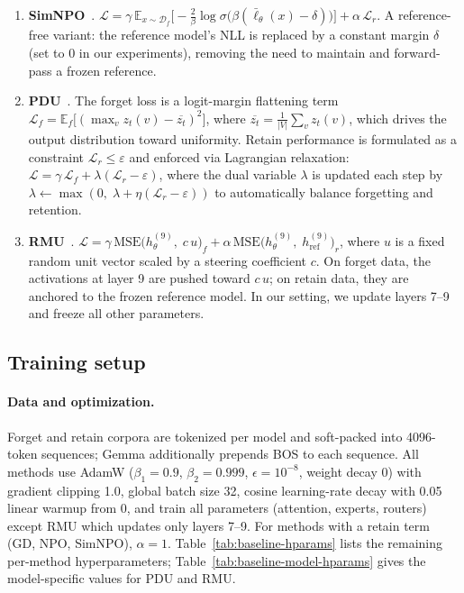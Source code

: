 \begin{enumerate}
\item \textbf{SimNPO}~\citep{fan2024simnpo}. $\mathcal{L} = \gamma\,\mathbb{E}_{x\sim\mathcal{D}_f}\!\Big[-\tfrac{2}{\beta}\log\sigma\!\big(\beta(\bar\ell_\theta(x)-\delta)\big)\Big]+\alpha\,\mathcal{L}_r$. A reference-free variant: the reference model's NLL is replaced by a constant margin $\delta$ (set to 0 in our experiments), removing the need to maintain and forward-pass a frozen reference.

\item \textbf{PDU}~\citep{entesari2025pdu}. The forget loss is a logit-margin flattening term $\mathcal{L}_f = \mathbb{E}_f\!\big[(\max_v z_t(v) - \overline{z_t})^2\big]$, where $\overline{z_t} = \frac{1}{|V|}\sum_v z_t(v)$, which drives the output distribution toward uniformity. Retain performance is formulated as a constraint $\mathcal{L}_r \le \varepsilon$ and enforced via Lagrangian relaxation: $\mathcal{L} = \gamma\,\mathcal{L}_f + \lambda(\mathcal{L}_r - \varepsilon)$, where the dual variable $\lambda$ is updated each step by $\lambda \leftarrow \max(0,\;\lambda + \eta(\mathcal{L}_r - \varepsilon))$ to automatically balance forgetting and retention.

\item \textbf{RMU}~\citep{li2024wmdp}. $\mathcal{L} = \gamma\,\mathrm{MSE}\!\big(h_\theta^{(9)},\;c\,u\big)_f + \alpha\,\mathrm{MSE}\!\big(h_\theta^{(9)},\;h_{\mathrm{ref}}^{(9)}\big)_r$, where $u$ is a fixed random unit vector scaled by a steering coefficient $c$. On forget data, the activations at layer 9 are pushed toward $c\,u$; on retain data, they are anchored to the frozen reference model. In our setting, we update layers 7--9 and freeze all other parameters.
\end{enumerate}

\subsection{Training setup}
\label{app:baseline-setup}

\paragraph{Data and optimization.} Forget and retain corpora are tokenized per model and soft-packed into 4096-token sequences; Gemma additionally prepends BOS to each sequence. All methods use AdamW ($\beta_1\!=\!0.9$, $\beta_2\!=\!0.999$, $\epsilon\!=\!10^{-8}$, weight decay 0) with gradient clipping 1.0, global batch size 32, cosine learning-rate decay with 0.05 linear warmup from 0, and train all parameters (attention, experts, routers) except RMU which updates only layers 7--9. For methods with a retain term (GD, NPO, SimNPO), $\alpha=1$. Table~\ref{tab:baseline-hparams} lists the remaining per-method hyperparameters; Table~\ref{tab:baseline-model-hparams} gives the model-specific values for PDU and RMU.

